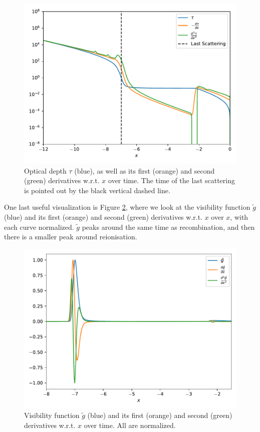 \documentclass{aa}
\begin{document}
\begin{figure}[ht]
    \centering
    \includegraphics[width=\hsize]{report/figures/tau.pdf}
    \caption{Optical depth $\tau$ (blue), as well as its first (orange) and second (green) derivatives w.r.t. $x$ over time. The time of the last scattering is pointed out by the black vertical dashed line.}
    \label{fig:tau}
\end{figure}

One last useful visualization is Figure \ref{fig:gtilde}, where we look at the visibility function $\tilde g$ (blue) and its first (orange) and second (green) derivatives w.r.t. $x$ over $x$, with each curve normalized. $\tilde g$ peaks around the same time as recombination, and then there is a smaller peak around reionisation.

\begin{figure}[ht]
    \centering
    \includegraphics[width=\hsize]{report/figures/gtilde.pdf}
    \caption{Visibility function $\tilde g$ (blue) and its first (orange) and second (green) derivatives w.r.t. $x$ over time. All are normalized.}
    \label{fig:gtilde}
\end{figure}
\end{document}
